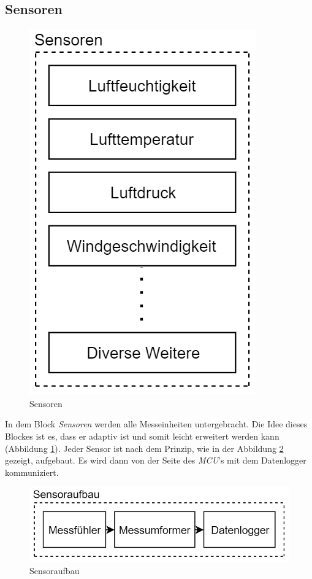 \subsection{Sensoren}
\begin{figure}[h]
\centering
\includegraphics[scale=0.8]{graphics/Sensoren.PNG}
\caption{Sensoren}
\label{fig:sensoren}
\end{figure}
In dem Block \textit{Sensoren} werden alle Messeinheiten untergebracht. Die Idee dieses Blockes ist es, dass er adaptiv ist und somit leicht erweitert werden kann (Abbildung \ref{fig:sensoren}). Jeder Sensor ist nach dem Prinzip, wie in der Abbildung \ref{fig:sensoraufbau} gezeigt, aufgebaut. Es wird dann von der Seite des \textit{MCU}'s mit dem Datenlogger kommuniziert.\\

\begin{figure}[h]
\centering
\includegraphics[scale=0.7]{graphics/Sensoraufbau.PNG}
\caption{Sensoraufbau}
\label{fig:sensoraufbau}
\end{figure}

